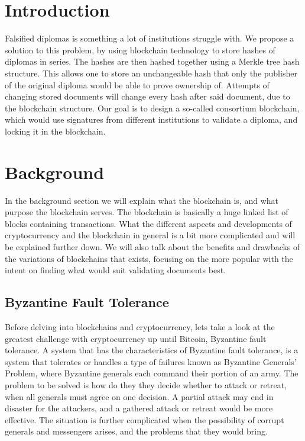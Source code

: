 \documentclass[11pt]{article}
\begin{document}
\tableofcontents

\newpage
{}

\section{Introduction}

Falsified diplomas is something a lot of institutions struggle with. We propose a solution to this problem, by using blockchain technology to store hashes of diplomas in series. The hashes are then hashed together using a Merkle tree hash structure. This allows one to store an unchangeable hash that only the publisher of the original diploma would be able to prove ownership of. Attempts of changing stored documents will change every hash after said document, due to the blockchain structure. Our goal is to design a so-called consortium blockchain, which would use signatures from different institutions to validate a diploma, and locking it in the blockchain. 

\section{Background}
In the background section we will explain what the blockchain is, and what purpose the blockchain serves. The blockchain is basically a huge linked list of blocks containing transactions. What the different aspects and developments of cryptocurrency and the blockchain in general is a bit more complicated and will be explained further down. We will also talk about the benefits and drawbacks of the variations of blockchains that exists, focusing on the more popular with the intent on finding what would suit validating documents best. 

\subsection{Byzantine Fault Tolerance}
Before delving into blockchains and cryptocurrency, lets take a look at the greatest challenge with cryptocurrency up until Bitcoin, Byzantine fault tolerance. A system that has the characteristics of Byzantine fault tolerance, is a system that tolerates or handles a type of failures known as Byzantine Generals' Problem\cite{lamport1982byzantine}, where Byzantine generals each command their portion of an army. The problem to be solved is how do they they decide whether to attack or retreat, when all generals must agree on one decision. A partial attack may end in disaster for the attackers, and a gathered attack or retreat would be more effective. The situation is further complicated when the possibility of corrupt generals and messengers arises, and the problems that they would bring.
\end{document}
